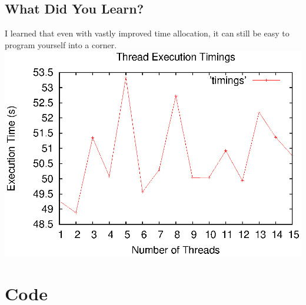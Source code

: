 \documentclass[letterpaper,10pt,titlepage]{article}
\begin{document}
\subsection{What Did You Learn?}
\label{Learned}
I learned that even with vastly improved time allocation, it can still be easy to program yourself into a corner.
\includegraphics[height=\textheight]{timings.eps}


\section{Code}
\label{myar Source Code}

\end{document}
